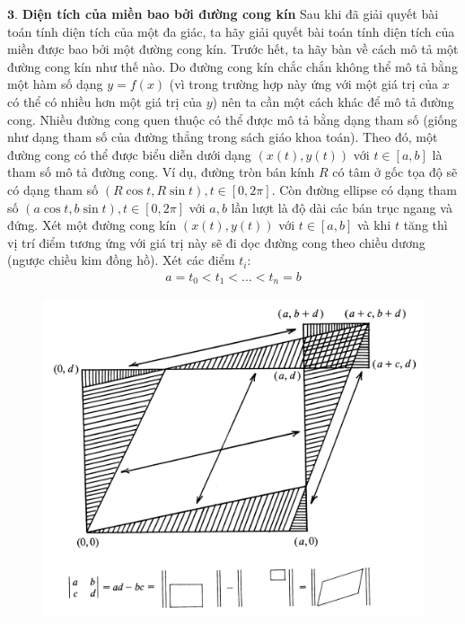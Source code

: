\begin{multicols}{2}
\begin{figure}[H]
		\vspace*{-10pt}
	\end{figure}
	$\pmb{3.}$ \textbf{\color{toanhocdoisong}Diện tích của miền bao bởi đường cong kín}
	\vskip 0.1cm
	Sau khi đã giải quyết bài toán tính diện tích của một đa giác, ta hãy giải quyết bài toán tính diện tích của miền được bao bởi một đường cong kín. Trước hết, ta hãy bàn về cách mô tả một đường cong kín như thế nào. Do đường cong kín chắc chắn không thể mô tả bằng một hàm số dạng $y=f(x)$ (vì trong trường hợp này ứng với một giá trị của $x$ có thể có nhiều hơn một giá trị của $y$) nên ta cần một cách khác để mô tả đường cong.
	\vskip 0.1cm
	Nhiều đường cong quen thuộc có thể được mô tả bằng dạng tham số (giống như dạng tham số của đường thẳng trong sách giáo khoa toán). Theo đó, một đường cong có thể được biểu diễn dưới dạng $(x(t),y(t))$ với $t\in [a,b]$ là tham số mô tả đường cong.
	\vskip 0.1cm
	Ví dụ, đường tròn bán kính $R$ có tâm ở gốc tọa độ sẽ có dạng tham số $(R\cos t,R\sin t), t\in [0,2\pi]$. Còn đường ellipse có dạng tham số $(a\cos t,b\sin t), t\in [0,2\pi]$ với $a,b$ lần lượt là độ dài các bán trục ngang và đứng.
	\vskip 0.1cm
	Xét một đường cong kín $(x(t),y(t))$ với $t \in [a,b]$ và khi $t$ tăng thì vị trí điểm tương ứng với giá trị  này sẽ đi dọc đường cong theo chiều dương (ngược chiều kim đồng hồ). Xét các điểm $t_i$:
	\begin{align*}
		a=t_0<t_1<\ldots<t_n=b
	\end{align*}
	\begin{figure}[H]
		\vspace*{-5pt}
		\centering
		\captionsetup{labelformat= empty, justification=centering}
		\includegraphics[width= 1\linewidth]{20}

\end{figure}
\end{multicols}

